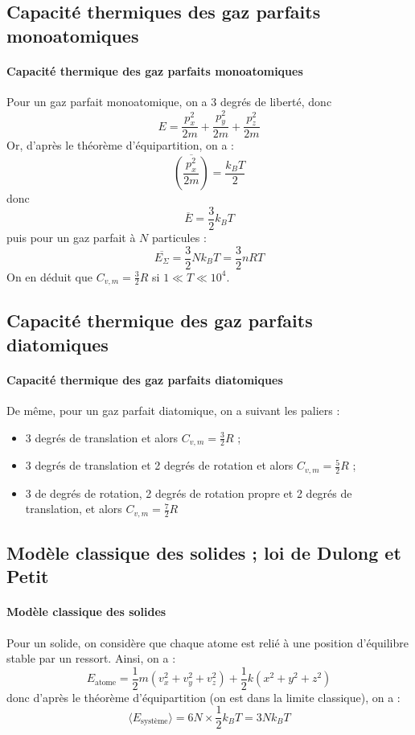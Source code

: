 \documentclass[french]{book}
\theoremstyle{plain}
\theoremstyle{definition}
\theoremstyle{remark}
\begin{document}
\subsection{Capacité thermiques des gaz parfaits monoatomiques}

\paragraph{Capacité thermique des gaz parfaits monoatomiques} Pour un gaz parfait monoatomique, on a 3 degrés de liberté, donc $$E=\frac{p_x^2}{2m}+\frac{p_y^2}{2m}+\frac{p_z^2}{2m}$$ Or, d'après le théorème d'équipartition, on a : $$\overline{\left(\frac{p_x^2}{2m}\right)}=\frac{k_BT}{2}$$ donc $$\overline{E}=\frac{3}{2}k_BT$$ puis pour un gaz parfait à $N$ particules : $$\overline{E_\Sigma}=\frac{3}{2}Nk_BT=\frac{3}{2}nRT$$ On en déduit que $\displaystyle C_{v,m}=\frac{3}{2}R$ si $1\ll T\ll 10^{4}$.

\subsection{Capacité thermique des gaz parfaits diatomiques}

\paragraph{Capacité thermique des gaz parfaits diatomiques}De même, pour un gaz parfait diatomique, on a suivant les paliers :
\begin{itemize}
	\item 3 degrés de translation et alors $C_{v,m}=\frac{3}{2}R$ ;
	\item 3 degrés de translation et 2 degrés de rotation et alors $C_{v,m}=\frac{5}{2}R$ ;
	\item 3 de degrés de rotation, 2 degrés de rotation propre et 2 degrés de translation, et alors $C_{v,m}=\frac{7}{2}R$
\end{itemize}

\subsection{Modèle classique des solides ; loi de Dulong et Petit}
\paragraph{Modèle classique des solides} Pour un solide, on considère que chaque atome est relié à une position d'équilibre stable par un ressort. Ainsi, on a : $$E_\text{atome}=\frac{1}{2}m(v_x^2+v_y^2+v_z^2)+\frac{1}{2}k(x^2+y^2+z^2)$$ donc d'après le théorème d'équipartition (on est dans la limite classique), on a : $$\langle E_\text{système}\rangle=6N\times\frac{1}{2}k_BT=3Nk_BT$$
\end{document}

